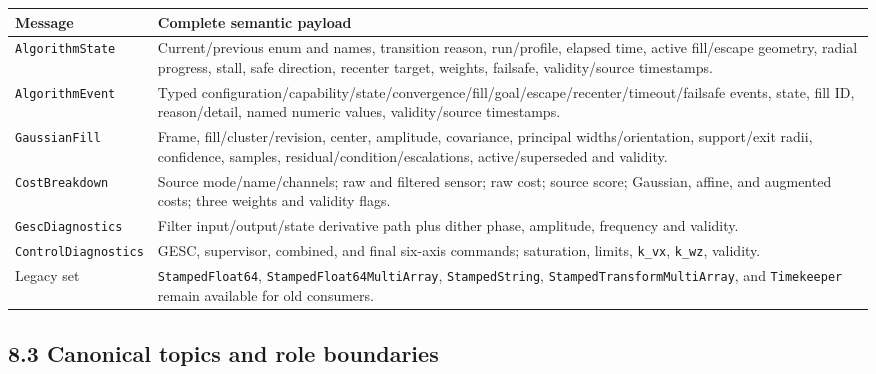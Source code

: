 \documentclass[
  10pt,
  letterpaper,
]{article}
\newcounter{none} %
\begin{document}
{\def\LTcaptype{none} %
\begin{longtable}[]{@{}
  >{\raggedright\arraybackslash}p{}
  >{\raggedright\arraybackslash}p{}@{}}
\toprule\noalign{}
\begin{minipage}[b]{\linewidth}\raggedright
Message
\end{minipage} & \begin{minipage}[b]{\linewidth}\raggedright
Complete semantic payload
\end{minipage} \\
\midrule\noalign{}
\endhead
\bottomrule\noalign{}
\endlastfoot
\nolinkurl{AlgorithmState} & Current/previous enum and names, transition reason, run/profile, elapsed time, active fill/escape geometry, radial progress, stall, safe direction, recenter target, weights, failsafe, validity/source timestamps. \\
\nolinkurl{AlgorithmEvent} & Typed configuration/capability/state/convergence/fill/goal/escape/recenter/timeout/failsafe events, state, fill ID, reason/detail, named numeric values, validity/source timestamps. \\
\nolinkurl{GaussianFill} & Frame, fill/cluster/revision, center, amplitude, covariance, principal widths/orientation, support/exit radii, confidence, samples, residual/condition/escalations, active/superseded and validity. \\
\nolinkurl{CostBreakdown} & Source mode/name/channels; raw and filtered sensor; raw cost; source score; Gaussian, affine, and augmented costs; three weights and validity flags. \\
\nolinkurl{GescDiagnostics} & Filter input/output/state derivative path plus dither phase, amplitude, frequency and validity. \\
\nolinkurl{ControlDiagnostics} & GESC, supervisor, combined, and final six-axis commands; saturation, limits, \nolinkurl{k\_vx}, \nolinkurl{k\_wz}, validity. \\
Legacy set & \nolinkurl{StampedFloat64}, \nolinkurl{StampedFloat64MultiArray}, \nolinkurl{StampedString}, \nolinkurl{StampedTransformMultiArray}, and \nolinkurl{Timekeeper} remain available for old consumers. \\
\end{longtable}
}

\subsection{8.3 Canonical topics and role boundaries}\label{canonical-topics-and-role-boundaries}
\end{document}
